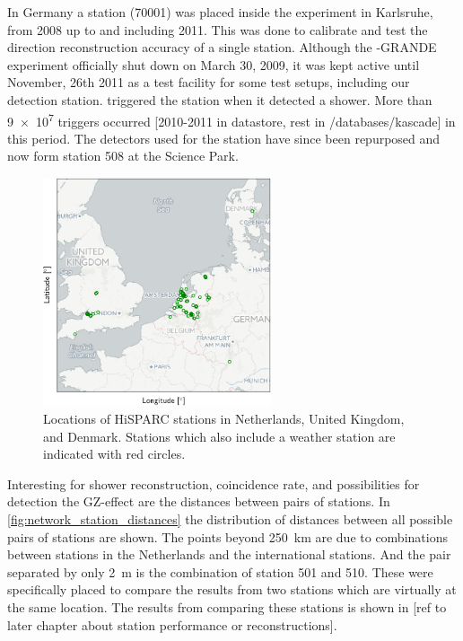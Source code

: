 In Germany a station (70001) was placed inside the \kascade experiment in Karlsruhe, from 2008 up to and including 2011. This was done to calibrate and test the direction reconstruction accuracy of a single \hisparc station. Although the \kascade-GRANDE experiment officially shut down on March 30, 2009, it was kept active until November, 26th 2011 as a test facility for some test setups, including our detection station. \kascade triggered the \hisparc station when it detected a shower. More than \num{9e7} triggers occurred [2010-2011 in datastore, rest in /databases/kascade] in this period. The detectors used for the \kascade station have since been repurposed and now form station 508 at the Science Park.

\begin{figure}
    \centering
    \includegraphics[width=0.6\textwidth]
                    {plots/cluster/network}
    \caption{Locations of HiSPARC stations in Netherlands, United Kingdom, and Denmark. Stations which also include a weather station are indicated with red circles.}
    \label{fig:network}
\end{figure}

Interesting for shower reconstruction, coincidence rate, and possibilities for detection the GZ-effect are the distances between pairs of stations. In \cref{fig:network_station_distances} the distribution of distances between all possible pairs of stations are shown. The points beyond \SI{250}{\kilo\meter} are due to combinations between stations in the Netherlands and the international stations. And the pair separated by only \SI{2}{\meter} is the combination of station 501 and 510. These were specifically placed to compare the results from two stations which are virtually at the same location. The results from comparing these stations is shown in [ref to later chapter about station performance or reconstructions].

